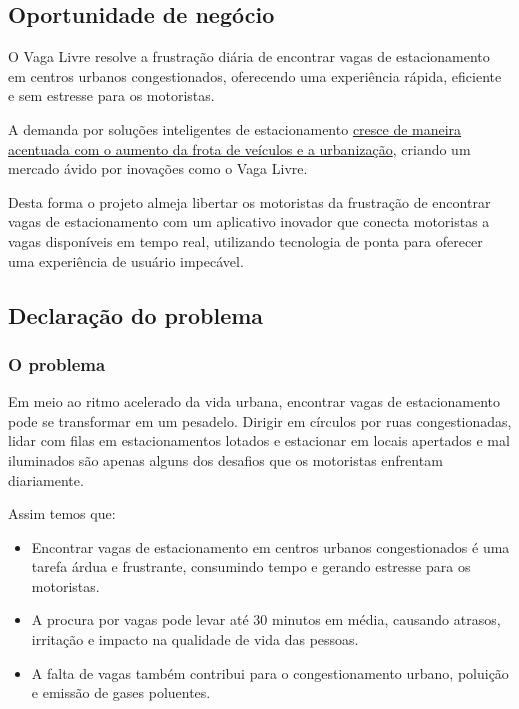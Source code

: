 \documentclass[a4paper,12pt]{article}
\begin{document}
\subsection{Oportunidade de negócio}

O Vaga Livre resolve a frustração diária de encontrar vagas de estacionamento em centros urbanos congestionados, oferecendo uma experiência rápida, eficiente e sem estresse para os motoristas.

A demanda por soluções inteligentes de estacionamento \href{https://iot-analytics.com/smart-parking-market-report-2019-2023/}{cresce de maneira acentuada com o aumento da frota de veículos e a urbanização}, criando um mercado ávido por inovações como o Vaga Livre.

Desta forma o projeto almeja libertar os motoristas da frustração de encontrar vagas de estacionamento com um aplicativo inovador que conecta motoristas a vagas disponíveis em tempo real, utilizando tecnologia de ponta para oferecer uma experiência de usuário impecável.

\subsection{Declaração do problema}

\subsubsection{O problema}

Em meio ao ritmo acelerado da vida urbana, encontrar vagas de estacionamento pode se transformar em um pesadelo. Dirigir em círculos por ruas congestionadas, lidar com filas em estacionamentos lotados e estacionar em locais apertados e mal iluminados são apenas alguns dos desafios que os motoristas enfrentam diariamente. 

Assim temos que:

\begin{itemize}
    \item Encontrar vagas de estacionamento em centros urbanos congestionados é uma tarefa árdua e frustrante, consumindo tempo e gerando estresse para os motoristas.
    \item A procura por vagas pode levar até 30 minutos em média, causando atrasos, irritação e impacto na qualidade de vida das pessoas.
    \item A falta de vagas também contribui para o congestionamento urbano, poluição e emissão de gases poluentes.
\end{itemize}
\end{document}
